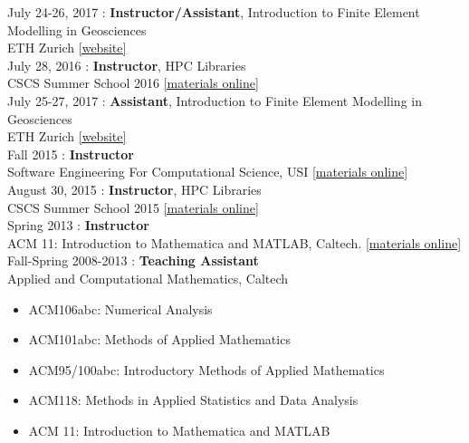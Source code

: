 \noindent July 24-26, 2017 : \textbf{Instructor/Assistant}, Introduction to Finite Element Modelling in Geosciences \\
ETH Zurich
\href{https://jupiter2.ethz.ch/~gfdteaching/femblockcourse/2017/}{[website]}\\

\noindent July 28, 2016 : \textbf{Instructor}, HPC Libraries \\
CSCS Summer School 2016
\href{https://github.com/eth-cscs/SummerSchool2016}{[materials online]}\\

\noindent July 25-27, 2017 : \textbf{Assistant}, Introduction to Finite Element Modelling in Geosciences \\
ETH Zurich
\href{http://jupiter.ethz.ch/~gfdteaching/femblockcourse/2016/}{[website]}\\

\noindent Fall 2015 : \textbf{Instructor} \\
Software Engineering For Computational Science, USI
\href{https://bitbucket.org/psanan/sefcs2015}{[materials online]}\\

\noindent August 30, 2015 : \textbf{Instructor}, HPC Libraries \\
CSCS Summer School 2015
\href{https://github.com/eth-cscs/SummerSchool2015/tree/master/libraries}{[materials online]}\\

\noindent Spring 2013 : \textbf{Instructor}\\
ACM 11: Introduction to Mathematica and MATLAB, Caltech.
\href{https://bitbucket.org/psanan/introduction-to-matlab-and-mathematica}{[materials online]}\\

\noindent Fall-Spring 2008-2013 : \textbf{Teaching Assistant}\\
Applied and Computational Mathematics, Caltech
\begin{itemize} \itemsep0em
\item ACM106abc: Numerical Analysis
\item ACM101abc: Methods of Applied Mathematics
\item ACM95/100abc: Introductory Methods of Applied Mathematics
\item ACM118: Methods in Applied Statistics and Data Analysis
\item ACM 11: Introduction to Mathematica and MATLAB
\end{itemize}

